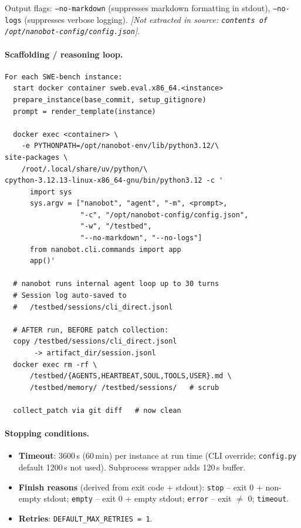 \documentclass{llmxive}
\begin{document}
Output flags: \texttt{--no-markdown} (suppresses markdown formatting in stdout), \texttt{--no-logs} (suppresses verbose logging). \textit{[Not extracted in source: \texttt{contents of /opt/nanobot-config/config.json}]}.

\paragraph{Scaffolding / reasoning loop.}
\begin{verbatim}
For each SWE-bench instance:
  start docker container sweb.eval.x86_64.<instance>
  prepare_instance(base_commit, setup_gitignore)
  prompt = render_template(instance)

  docker exec <container> \
    -e PYTHONPATH=/opt/nanobot-env/lib/python3.12/\
site-packages \
    /root/.local/share/uv/python/\
cpython-3.12.13-linux-x86_64-gnu/bin/python3.12 -c '
      import sys
      sys.argv = ["nanobot", "agent", "-m", <prompt>,
                  "-c", "/opt/nanobot-config/config.json",
                  "-w", "/testbed",
                  "--no-markdown", "--no-logs"]
      from nanobot.cli.commands import app
      app()'

  # nanobot runs internal agent loop up to 30 turns
  # Session log auto-saved to
  #   /testbed/sessions/cli_direct.jsonl

  # AFTER run, BEFORE patch collection:
  copy /testbed/sessions/cli_direct.jsonl
       -> artifact_dir/session.jsonl
  docker exec rm -rf \
      /testbed/{AGENTS,HEARTBEAT,SOUL,TOOLS,USER}.md \
      /testbed/memory/ /testbed/sessions/   # scrub

  collect_patch via git diff   # now clean
\end{verbatim}

\paragraph{Stopping conditions.}
\begin{itemize}
  \item \textbf{Timeout}: 3600\,s (60\,min) per instance at run time (CLI override; \texttt{config.py} default 1200\,s not used). Subprocess wrapper adds 120\,s buffer.
  \item \textbf{Finish reasons} (derived from exit code + stdout): \texttt{stop} -- exit 0 + non-empty stdout; \texttt{empty} -- exit 0 + empty stdout; \texttt{error} -- exit $\neq$ 0; \texttt{timeout}.
  \item \textbf{Retries}: \texttt{DEFAULT\_MAX\_RETRIES = 1}.
\end{itemize}
\end{document}
